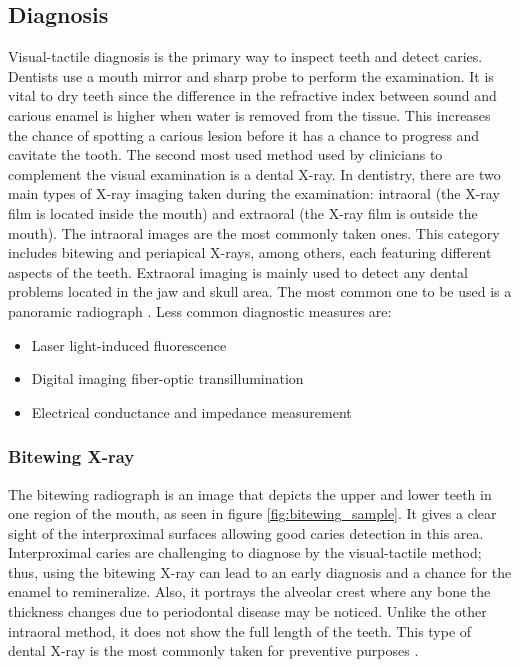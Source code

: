 \subsection{Diagnosis}
Visual-tactile diagnosis is the primary way to inspect teeth and detect caries. Dentists use a mouth mirror and sharp probe to perform the examination. It is vital to dry teeth since the difference in the refractive index between sound and carious enamel is higher when water is removed from the tissue. This increases the chance of spotting a carious lesion before it has a chance to progress and cavitate the tooth.
The second most used method used by clinicians to complement the visual examination is a dental X-ray. In dentistry, there are two main types of X-ray imaging taken during the examination: intraoral (the X-ray film is located inside the mouth) and extraoral (the X-ray film is outside the mouth). The intraoral images are the most commonly taken ones. This category includes bitewing and periapical X-rays, among others, each featuring different aspects of the teeth. Extraoral imaging is mainly used to detect any dental problems located in the jaw and skull area. The most common one to be used is a panoramic radiograph \cite{2015}. \newline
Less common diagnostic measures are:

\begin{itemize}
    \item Laser light-induced fluorescence
    \item Digital imaging fiber-optic transillumination
    \item Electrical conductance and impedance measurement
\end{itemize}

\subsubsection{Bitewing X-ray}
The bitewing radiograph is an image that depicts the upper and lower teeth in one region of the mouth, as seen in figure \ref{fig:bitewing_sample}. It gives a clear sight of the interproximal surfaces allowing good caries detection in this area. Interproximal caries are challenging to diagnose by the visual-tactile method; thus, using the bitewing X-ray can lead to an early diagnosis and a chance for the enamel to remineralize. Also, it portrays the alveolar crest where any bone the thickness changes due to periodontal disease may be noticed. Unlike the other intraoral method, it does not show the full length of the teeth. This type of dental X-ray is the most commonly taken for preventive purposes \cite{2015}.

